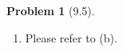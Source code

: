 \documentclass[twoside,11pt]{article}
\theoremstyle{definition}
\newtheorem{problem}{Problem}
\theoremstyle{remark}
\begin{document}
\begin{problem}[9.5]
\begin{enumerate}[label=(\alph*)]
\item Please refer to (b).



\end{enumerate}
\end{problem}
\end{document}
